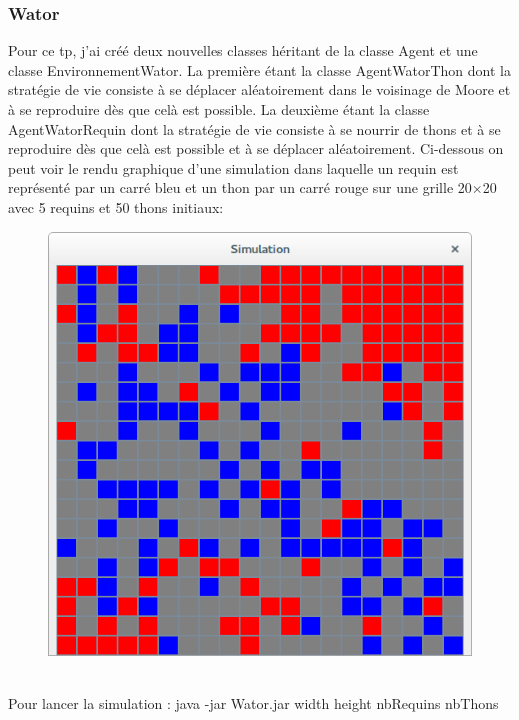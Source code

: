 \documentclass[a4paper,12pt]{report}
\begin{document}
\subsubsection*{Wator}
Pour ce tp, j'ai créé deux nouvelles classes héritant de la classe Agent et une classe EnvironnementWator. La première étant la classe AgentWatorThon dont la stratégie de vie consiste à se déplacer aléatoirement dans le voisinage de Moore et à se reproduire dès que celà est possible. La deuxième étant la classe AgentWatorRequin dont la stratégie de vie consiste à se nourrir de thons et à se reproduire dès que celà est possible et à se déplacer aléatoirement. Ci-dessous on peut voir le rendu graphique d'une simulation dans laquelle un requin est représenté par un carré bleu et un thon par un carré rouge sur une grille 20$\times$20 avec 5 requins et 50 thons initiaux:
\begin{figure}[!ht]
	\center
	\includegraphics[scale=0.5]{./wator.png}
\end{figure} \\
\noindent Pour lancer la simulation : java -jar Wator.jar width height nbRequins nbThons 
\end{document}
